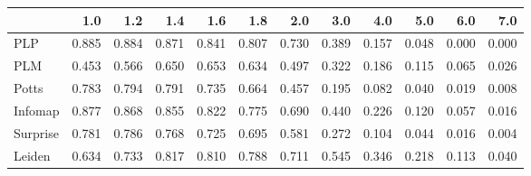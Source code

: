 \begin{tabular}{lrrrrrrrrrrr}
\toprule
{} &   1.0 &   1.2 &   1.4 &   1.6 &   1.8 &   2.0 &   3.0 &   4.0 &   5.0 &   6.0 &   7.0 \\
\midrule
PLP      & 0.885 & 0.884 & 0.871 & 0.841 & 0.807 & 0.730 & 0.389 & 0.157 & 0.048 & 0.000 & 0.000 \\
PLM      & 0.453 & 0.566 & 0.650 & 0.653 & 0.634 & 0.497 & 0.322 & 0.186 & 0.115 & 0.065 & 0.026 \\
Potts    & 0.783 & 0.794 & 0.791 & 0.735 & 0.664 & 0.457 & 0.195 & 0.082 & 0.040 & 0.019 & 0.008 \\
Infomap  & 0.877 & 0.868 & 0.855 & 0.822 & 0.775 & 0.690 & 0.440 & 0.226 & 0.120 & 0.057 & 0.016 \\
Surprise & 0.781 & 0.786 & 0.768 & 0.725 & 0.695 & 0.581 & 0.272 & 0.104 & 0.044 & 0.016 & 0.004 \\
Leiden   & 0.634 & 0.733 & 0.817 & 0.810 & 0.788 & 0.711 & 0.545 & 0.346 & 0.218 & 0.113 & 0.040 \\
\bottomrule
\end{tabular}
